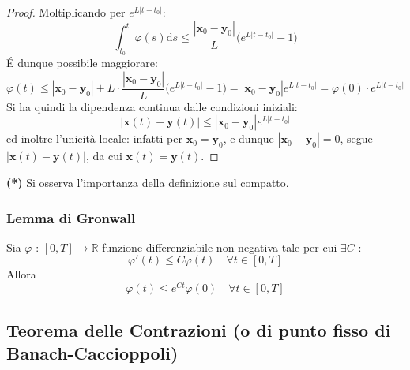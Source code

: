 \documentclass[10pt, oneside]{book}
\theoremstyle{plain}
\begin{document}
\begin{proof}
Moltiplicando per $\displaystyle e^{L |t - t_0|}$:
\[\int_{t_0}^t\varphi(s)\textrm{d}s \leq \frac{|\mathbf{x}_0 - \mathbf{y}_0|}{L}\big(e^{L |t - t_0|} - 1 \big)\]
\'E dunque possibile maggiorare:
\[\varphi(t) \leq |\mathbf{x}_0 - \mathbf{y}_0| + L \cdot \frac{|\mathbf{x}_0 - \mathbf{y}_0|}{L}\big(e^{L |t - t_0|} - 1 \big) =  |\mathbf{x}_0 - \mathbf{y}_0|e^{L |t - t_0|} = \varphi(0) \cdot e^{L |t - t_0|}\]
Si ha quindi la dipendenza continua dalle condizioni iniziali:
\[|\mathbf{x}(t) - \mathbf{y}(t)| \leq  |\mathbf{x}_0 - \mathbf{y}_0|e^{L |t - t_0|}\]
ed inoltre l'unicità locale: infatti per $\mathbf{x}_0 = \mathbf{y}_0$, e dunque $ |\mathbf{x}_0 - \mathbf{y}_0| = 0$, segue $ |\mathbf{x}(t) - \mathbf{y}(t)|$, da cui $\mathbf{x}(t) = \mathbf{y}(t)$.
\end{proof}
\textbf{(*)} Si osserva l'importanza della definizione sul compatto.

\subsubsection{Lemma di Gronwall}
\begin{lem}
Sia $\varphi$ : $[0,T] \rightarrow \mathbb{R}$ funzione differenziabile non negativa tale per cui $\exists C$ : 
\[\varphi'(t) \leq C \varphi(t) \quad \forall t \in [0,T]\]
Allora 
\[\varphi(t) \leq e^{Ct}\varphi(0) \quad \forall t \in [0,T]\]
\end{lem}

\subsection{Teorema delle Contrazioni (o di punto fisso di Banach-Caccioppoli)}
\end{document}
